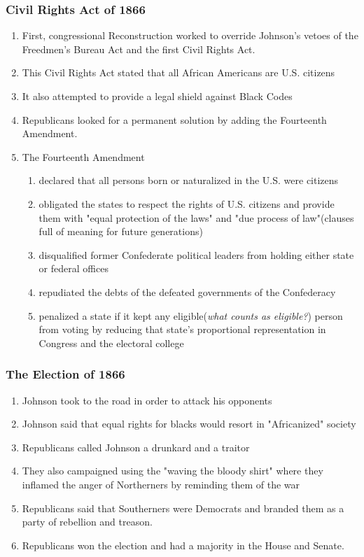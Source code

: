 \documentclass[12pt]{article} %
\begin{document}
\subsubsection{Civil Rights Act of 1866}
\begin{enumerate}
	\item First, congressional Reconstruction worked to override Johnson's vetoes of the Freedmen's
		Bureau Act and the first Civil Rights Act.
	\item This Civil Rights Act stated that all African Americans are U.S. citizens
	\item It also attempted to provide a legal shield against Black Codes
	\item Republicans looked for a permanent solution by adding the Fourteenth Amendment.
	\item The Fourteenth Amendment
	\begin{enumerate}
		\item declared that all persons born or naturalized in the U.S. were citizens
		\item obligated the states to respect the rights of U.S. citizens and provide them with 
			"equal protection of the laws" and "due process of law"(clauses full of meaning for 
			future generations)
		\item disqualified former Confederate political leaders from holding either state or federal
			offices
		\item repudiated the debts of the defeated governments of the Confederacy
		\item penalized a state if it kept any eligible(\textit{what counts as eligible?}) person 
			from voting by reducing that state's proportional representation in Congress and the 
			electoral college
	\end{enumerate}
\end{enumerate}

\subsubsection{The Election of 1866}
\begin{enumerate}
	\item Johnson took to the road in order to attack his opponents
	\item Johnson said that equal rights for blacks would resort in "Africanized" society
	\item Republicans called Johnson a drunkard and a traitor
	\item They also campaigned using the "waving the bloody shirt" where they inflamed the anger of
		Northerners by reminding them of the war
	\item Republicans said that Southerners were Democrats and branded them as a party of rebellion
		and treason.
	\item Republicans won the election and had a majority in the House and Senate.
\end{enumerate}
\end{document}
